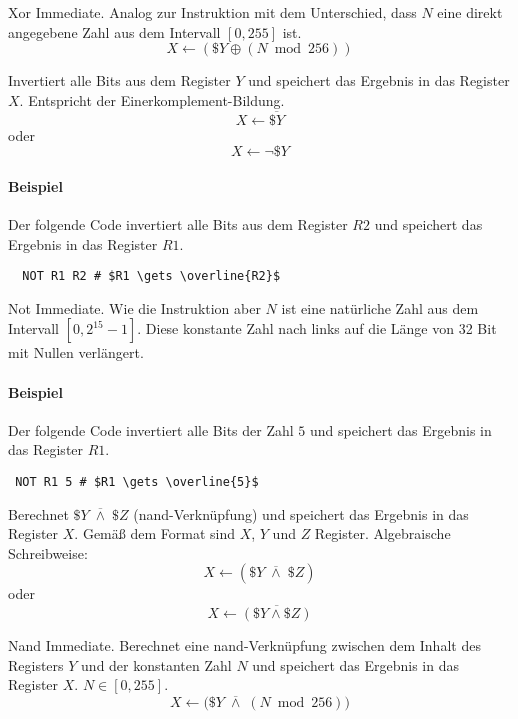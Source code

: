\glqq Xor Immediate\grqq.
Analog zur Instruktion  mit dem Unterschied, dass $N$ eine direkt
angegebene Zahl aus dem Intervall $[0, 255]$ ist.
\[
    X \gets (\$Y \oplus (N \bmod 256))
\]


Invertiert alle Bits aus dem Register $Y$ und speichert das Ergebnis in das
Register $X$. Entspricht der Einerkomplement-Bildung.
\[
    X \gets \overline{\$Y}
\]
oder
\[
    X \gets \lnot \$Y
\]

\paragraph{Beispiel} 
Der folgende Code invertiert alle Bits aus dem Register $R2$ und speichert das
Ergebnis in das Register $R1$.
\begin{lstlisting}
  NOT R1 R2 # $R1 \gets \overline{R2}$
\end{lstlisting}



\glqq Not Immediate\grqq.
Wie die Instruktion  aber $N$ ist eine natürliche Zahl aus dem
Intervall $[0, 2^{15}-1]$. Diese konstante Zahl nach links auf die Länge von 32
Bit mit Nullen verlängert.

\paragraph{Beispiel} 
Der folgende Code invertiert alle Bits der Zahl $5$ und speichert das Ergebnis
in das Register $R1$.
\begin{lstlisting}
 NOT R1 5 # $R1 \gets \overline{5}$
\end{lstlisting}


Berechnet $\$Y \; \overline{\land} \; \$Z$ (nand-Verknüpfung) und speichert das
Ergebnis in das Register $X$. Gemäß dem Format  sind $X$, $Y$ und
$Z$ Register. Algebraische Schreibweise:
\[
    X \gets (\$Y \; \overline{\land} \; \$Z)
\]
oder
\[
    X \gets \overline{ (\$Y \land \$Z) }
\]


\glqq Nand Immediate\grqq.
Berechnet eine nand-Verknüpfung zwischen dem Inhalt des Registers $Y$ und der
konstanten Zahl $N$ und speichert das Ergebnis in das Register $X$.
$N \in [0, 255]$.
\[
    X \gets \big(\$Y \; \overline{\land} \; (N \bmod 256) \big)
\]



